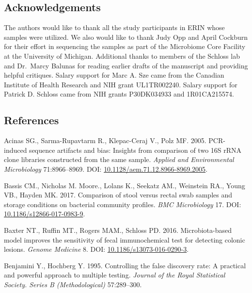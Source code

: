 \documentclass[11pt,]{article}
\begin{document}
\newpage

\subsection{Acknowledgements}\label{acknowledgements}

The authors would like to thank all the study participants in ERIN whose
samples were utilized. We also would like to thank Judy Opp and April
Cockburn for their effort in sequencing the samples as part of the
Microbiome Core Facility at the University of Michigan. Additional
thanks to members of the Schloss lab and Dr.~Marcy Balunas for reading
earlier drafts of the manuscript and providing helpful critiques. Salary
support for Marc A. Sze came from the Canadian Institute of Health
Research and NIH grant UL1TR002240. Salary support for Patrick D.
Schloss came from NIH grants P30DK034933 and 1R01CA215574.

\newpage

\subsection{References}\label{references}

\hypertarget{refs}{}
\hypertarget{ref-Acinas2005}{}
Acinas SG., Sarma-Rupavtarm R., Klepac-Ceraj V., Polz MF. 2005.
PCR-induced sequence artifacts and bias: Insights from comparison of two
16S rRNA clone libraries constructed from the same sample. \emph{Applied
and Environmental Microbiology} 71:8966--8969. DOI:
\href{https://doi.org/10.1128/aem.71.12.8966-8969.2005}{10.1128/aem.71.12.8966-8969.2005}.

\hypertarget{ref-storage_Bassis_2017}{}
Bassis CM., Nicholas M. Moore., Lolans K., Seekatz AM., Weinstein RA.,
Young VB., Hayden MK. 2017. Comparison of stool versus rectal swab
samples and storage conditions on bacterial community profiles.
\emph{BMC Microbiology} 17. DOI:
\href{https://doi.org/10.1186/s12866-017-0983-9}{10.1186/s12866-017-0983-9}.

\hypertarget{ref-Baxter2016}{}
Baxter NT., Ruffin MT., Rogers MAM., Schloss PD. 2016. Microbiota-based
model improves the sensitivity of fecal immunochemical test for
detecting colonic lesions. \emph{Genome Medicine} 8. DOI:
\href{https://doi.org/10.1186/s13073-016-0290-3}{10.1186/s13073-016-0290-3}.

\hypertarget{ref-benjamini_controlling_1995}{}
Benjamini Y., Hochberg Y. 1995. Controlling the false discovery rate: A
practical and powerful approach to multiple testing. \emph{Journal of
the Royal Statistical Society. Series B (Methodological)} 57:289--300.
\end{document}
